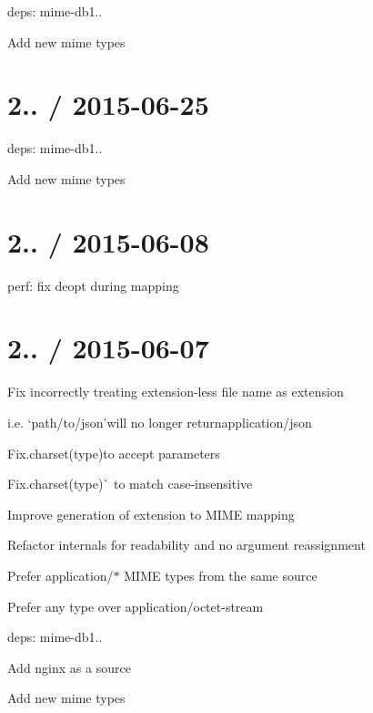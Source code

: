 \begin{DoxyItemize}
\item deps\+: mime-\/db1..
\begin{DoxyItemize}
\item Add new mime types
\end{DoxyItemize}
\end{DoxyItemize}

\section*{2.. / 2015-\/06-\/25 }


\begin{DoxyItemize}
\item deps\+: mime-\/db1..
\begin{DoxyItemize}
\item Add new mime types
\end{DoxyItemize}
\end{DoxyItemize}

\section*{2.. / 2015-\/06-\/08 }


\begin{DoxyItemize}
\item perf\+: fix deopt during mapping
\end{DoxyItemize}

\section*{2.. / 2015-\/06-\/07 }


\begin{DoxyItemize}
\item Fix incorrectly treating extension-\/less file name as extension
\begin{DoxyItemize}
\item i.\+e. `\textquotesingle{}path/to/json'{\ttfamily will no longer return}application/json{\ttfamily }
\end{DoxyItemize}
\item {\ttfamily Fix}.charset(type){\ttfamily to accept parameters}
\item {\ttfamily Fix}.charset(type)\`{} to match case-\/insensitive
\item Improve generation of extension to M\+I\+ME mapping
\item Refactor internals for readability and no argument reassignment
\item Prefer {\ttfamily application/$\ast$} M\+I\+ME types from the same source
\item Prefer any type over {\ttfamily application/octet-\/stream}
\item deps\+: mime-\/db1..
\begin{DoxyItemize}
\item Add nginx as a source
\item Add new mime types
\end{DoxyItemize}
\end{DoxyItemize}

